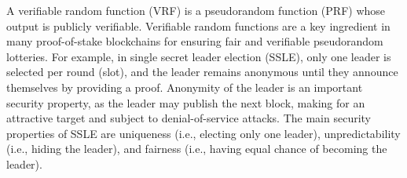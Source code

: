 %
%
A verifiable random function (VRF) is a pseudorandom function (PRF) whose output is publicly verifiable.
Verifiable random functions are a key ingredient in many proof-of-stake blockchains for ensuring fair and verifiable pseudorandom lotteries.
For example, in single secret leader election (SSLE), only one leader is selected per round (slot), and the
leader remains anonymous until they announce themselves by providing a proof.
Anonymity of the leader is an important security property, as the leader may publish the next block, making for an attractive target and subject to denial-of-service attacks.
The main security properties of SSLE are uniqueness (i.e., electing only one leader), unpredictability (i.e., hiding the leader), and fairness (i.e., having equal chance of becoming the leader).

